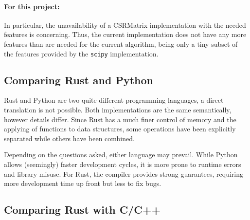 \paragraph{For this project:} In particular, the unavailability of a CSRMatrix
implementation with the needed features is concerning. Thus, the current
implementation does not have any more features than are needed for the current
algorithm, being only a tiny subset of the features provided by the
\verb|scipy| implementation.



\subsection{Comparing Rust and Python}\label{sec:rustvspython}

Rust and Python are two quite different programming languages, a direct
translation is not possible. Both implementations are the same semantically,
however details differ. Since Rust has a much finer control of memory and the
applying of functions to data structures, some operations have been explicitly
separated while others have been combined.

Depending on the questions asked, either language may prevail. While Python
allows (seemingly) faster development cycles, it is more prone to runtime
errors and library misuse. For Rust, the compiler provides strong guarantees,
requiring more development time up front but less to fix bugs.



\subsection{Comparing Rust with C/C++}\label{sec:rustvscc++}

